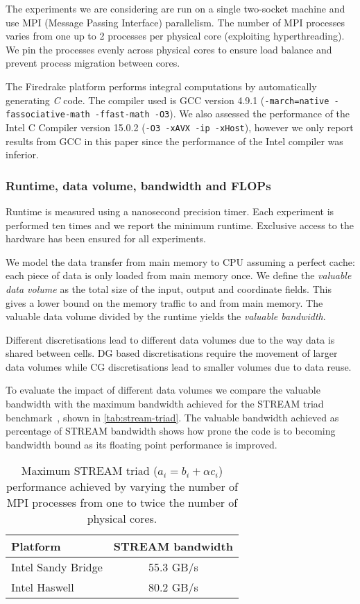 \documentclass[11pt, a4paper]{scrartcl}
\begin{document}
The experiments we are considering are run on a single two-socket
machine and use MPI (Message Passing Interface) parallelism. The
number of MPI processes varies from one up to 2 processes per physical
core (exploiting hyperthreading). We pin the processes evenly across
physical cores to ensure load balance and prevent process migration
between cores.

The Firedrake platform performs integral computations by automatically
generating \emph{C} code. The compiler used is GCC version 4.9.1
(\texttt{-march=native -fassociative-math -ffast-math -O3}).  We also
assessed the performance of the Intel C Compiler version 15.0.2
(\texttt{-O3 -xAVX -ip -xHost}), however we only report results from
GCC in this paper since the performance of the Intel compiler was
inferior.

\subsubsection{Runtime, data volume, bandwidth and FLOPs}
\label{sssec:runtime}
Runtime is measured using a nanosecond precision timer. Each
experiment is performed ten times and we report the minimum
runtime. Exclusive access to the hardware has been ensured for all
experiments.

We model the data transfer from main memory to CPU assuming a perfect
cache: each piece of data is only loaded from main memory once. We
define the \emph{valuable data volume} as the total size of the input,
output and coordinate fields. This gives a lower bound on the memory
traffic to and from main memory. The valuable data volume divided by
the runtime yields the \emph{valuable bandwidth}.

Different discretisations lead to different data volumes due to the
way data is shared between cells. $\mathrm{DG}$ based discretisations
require the movement of larger data volumes while $\mathrm{CG}$
discretisations lead to smaller volumes due to data reuse.

To evaluate the impact of different data volumes we compare the
valuable bandwidth with the maximum bandwidth achieved for the STREAM
triad benchmark~\citep{McCalpin:1995}, shown in
\autoref{tab:stream-triad}.  The valuable bandwidth achieved as
percentage of STREAM bandwidth shows how prone the code is to becoming
bandwidth bound as its floating point performance is improved.
\begin{table}[htbp]
  \centering
  \begin{tabular}{l|c}
    Platform           & STREAM bandwidth \\
    \hline
    Intel Sandy Bridge & 55.3 GB/s        \\
    Intel Haswell      & 80.2 GB/s        \\
  \end{tabular}
  \caption{Maximum STREAM triad ($a_i = b_i + \alpha c_i$) performance
    achieved by varying the number of MPI processes from one to twice
    the number of physical cores.\label{tab:stream-triad}}
\end{table}
\end{document}
